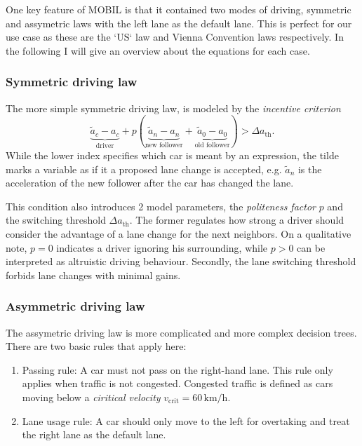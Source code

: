 One key feature of MOBIL is that it contained two modes of driving, symmetric and assymetric laws with the left
lane as the default lane. This is perfect for our use case as these are the `US` law and Vienna Convention laws
respectively. In the following I will give an overview about the equations for each case.

\subsubsection{Symmetric driving law}
The more simple symmetric driving law, is modeled by the \textit{incentive criterion}
\begin{equation}
  \underbrace{\tilde{a}_c - a_c}_\text{driver}
  + p (
  \underbrace{\tilde{a}_n - a_n}_\text{new follower}
  +
  \underbrace{\tilde{a}_0 - a_0}_\text{old follower}
  )
  > \Delta a_\text{th}.
  \label{eqn:US_incentive}
\end{equation}
While the lower index specifies which car is meant by an expression, the tilde marks a variable as if it a proposed
lane change is accepted, e.g. $\tilde{a}_n$ is the acceleration of the new follower after the car has changed the
lane.

This condition also introduces 2 model parameters, the \textit{politeness factor} $p$ and the switching threshold
$\Delta a_\text{th}$. The former regulates how strong a driver should consider the advantage of a lane change for
the next neighbors. On a qualitative note, $p=0$ indicates a driver ignoring his surrounding, while $p>0$ can be
interpreted as altruistic driving behaviour. Secondly, the lane switching threshold forbids lane changes with
minimal gains.

\subsubsection{Asymmetric driving law}
The assymetric driving law is more complicated and more complex decision trees. There are two basic rules that
apply here:
\begin{enumerate}
  \item Passing rule: A car must not pass on the right-hand lane. This rule only applies when traffic is not
    congested. Congested traffic is defined as cars moving below a \textit{ciritical velocity} 
    $v_\text{crit} = 60 \,
    \text{km/h}$.
  \item Lane usage rule: A car should only move to the left for overtaking and treat the right lane as the default
    lane.
\end{enumerate}

